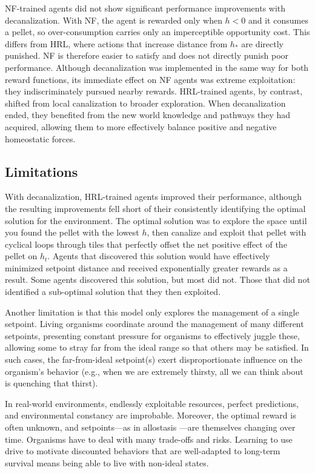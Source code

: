 NF-trained agents did not show significant performance improvements with decanalization. With NF, the agent is rewarded only when \(h < 0\) and it consumes a pellet, so over-consumption carries only an imperceptible opportunity cost. This differs from HRL, where actions that increase distance from \(h_*\) are directly punished. NF is therefore easier to satisfy and does not directly punish poor performance. Although decanalization was implemented in the same way for both reward functions, its immediate effect on NF agents was extreme exploitation: they indiscriminately pursued nearby rewards. HRL-trained agents, by contrast, shifted from local canalization to broader exploration. When decanalization ended, they benefited from the new world knowledge and pathways they had acquired, allowing them to more effectively balance positive and negative homeostatic forces.

\subsection{Limitations}

With decanalization, HRL-trained agents improved their performance, although the resulting improvements fell short of their consistently identifying the optimal solution for the environment. The optimal solution was to explore the space until you found the pellet with the lowest \(h\), then canalize and exploit that pellet with cyclical loops through tiles that perfectly offset the net positive effect of the pellet on \(h_t\). Agents that discovered this solution would have effectively minimized setpoint distance and received exponentially greater rewards as a result. Some agents discovered this solution, but most did not. Those that did not identified a sub-optimal solution that they then exploited. 

Another limitation is that this model only explores the management of a single setpoint. Living organisms coordinate around the management of many different setpoints, presenting constant pressure for organisms to effectively juggle these, allowing some to stray far from the ideal range so that others may be satisfied. In such cases, the far-from-ideal setpoint(s) exert disproportionate influence on the organism's behavior (e.g., when we are extremely thirsty, all we can think about is quenching that thirst).

In real-world environments, endlessly exploitable resources, perfect predictions, and environmental constancy are improbable. Moreover, the optimal reward is often unknown, and setpoints—as in allostasis \cite{sterling_allostasis_1988}—are themselves changing over time. Organisms have to deal with many trade-offs and risks. Learning to use drive to motivate discounted behaviors that are well-adapted to long-term survival means being able to live with non-ideal states.

